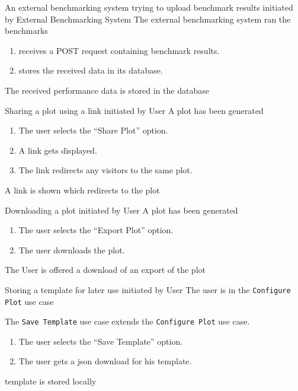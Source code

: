 \bigskip

{An external \gls{benchmarking system} trying to upload \glspl{benchmark result}}
{initiated by External Benchmarking System}
{The external \gls{benchmarking system} ran the benchmarks}
{\begin{enumerate}
    \item \parkview{} receives a POST request containing \glspl{benchmark result}.
    \item \parkview{} stores the received data in its database.
\end{enumerate}}
{The received performance data is stored in the database}

\bigskip

{Sharing a \gls{plot} using a link}
{initiated by User}
{A \gls{plot} has been generated}
{\begin{enumerate}
    \item The user selects the \enquote{Share Plot} option.
    \item A link gets displayed.
    \item The link redirects any visitors to the same \gls{plot}.
\end{enumerate}}
{A link is shown which redirects to the \gls{plot}}

\bigskip

{Downloading a \gls{plot}}
{initiated by User}
{A \gls{plot} has been generated}
{\begin{enumerate}
    \item The user selects the \enquote{Export Plot} option.
    \item The user downloads the \gls{plot}.
\end{enumerate}}
{The User is offered a download of an export of the \gls{plot}}

\bigskip

{Storing a \gls{template} for later use}
{initiated by User}
{The user is in the \texttt{Configure Plot} use case}
{The \texttt{Save Template} use case extends the \texttt{Configure Plot} use case.
\begin{enumerate}
    \item The user selects the \enquote{Save Template} option.
    \item The user gets a \gls{json} download for his \gls{template}.
\end{enumerate}}
{\Gls{template} is stored locally}

